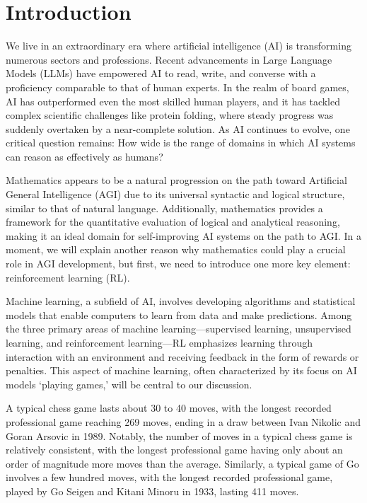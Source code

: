 
\section{Introduction\label{sec:intro}}

We live in an extraordinary era where artificial intelligence (AI) is transforming numerous sectors and professions. Recent advancements in Large Language Models (LLMs) have empowered AI to read, write, and converse with a proficiency comparable to that of human experts. In the realm of board games, AI has outperformed even the most skilled human players, and it has tackled complex scientific challenges like protein folding, where steady progress was suddenly overtaken by a near-complete solution. As AI continues to evolve, one critical question remains: How wide is the range of domains in which AI systems can reason as effectively as humans?

Mathematics appears to be a natural progression on the path toward Artificial General Intelligence (AGI) due to its universal syntactic and logical structure, similar to that of natural language. Additionally, mathematics provides a framework for the quantitative evaluation of logical and analytical reasoning, making it an ideal domain for self-improving AI systems on the path to AGI. In a moment, we will explain another reason why mathematics could play a crucial role in AGI development, but first, we need to introduce one more key element: reinforcement learning (RL).

Machine learning, a subfield of AI, involves developing algorithms and statistical models that enable computers to learn from data and make predictions. Among the three primary areas of machine learning---supervised learning, unsupervised learning, and reinforcement learning---RL emphasizes learning through interaction with an environment and receiving feedback in the form of rewards or penalties. This aspect of machine learning, often characterized by its focus on AI models `playing games,’ will be central to our discussion.

A typical chess game lasts about 30 to 40 moves, with the longest recorded professional game reaching 269 moves, ending in a draw between Ivan Nikolic and Goran Arsovic in 1989. Notably, the number of moves in a typical chess game is relatively consistent, with the longest professional game having only about an order of magnitude more moves than the average. Similarly, a typical game of Go involves a few hundred moves, with the longest recorded professional game, played by Go Seigen and Kitani Minoru in 1933, lasting 411 moves.

